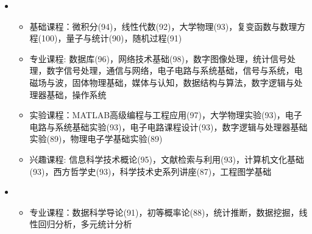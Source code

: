   \begin{itemize}[leftmargin=*]
    \item
      {\small
      \begin{itemize}
        \item{基础课程：微积分(94)，线性代数(92)，大学物理(93)，复变函数与数理方程(100)，量子与统计(90)，随机过程(91)}

        \item{专业课程: 数据库(96)，网络技术基础(98)，数字图像处理，统计信号处理，数字信号处理，通信与网络，电子电路与系统基础，信号与系统，电磁场与波，固体物理基础，媒体与认知，数据结构与算法，数字逻辑与处理器基础，操作系统}

        \item{实验课程：MATLAB高级编程与工程应用(97)，大学物理实验(93)，电子电路与系统基础实验(93)，电子电路课程设计(93)，数字逻辑与处理器基础实验(89)，物理电子学基础实验(89)}

        \item{兴趣课程: 信息科学技术概论(95)，文献检索与利用(93)，计算机文化基础(93)，西方哲学史(93)，科学技术史系列讲座(87)，工程图学基础}
      \end{itemize}
      }
    \item
       {\small
      \begin{itemize}
        \item{专业课程：数据科学导论(91)，初等概率论(88)，统计推断，数据挖掘，线性回归分析，多元统计分析}
      \end{itemize}
      }
  \end{itemize}